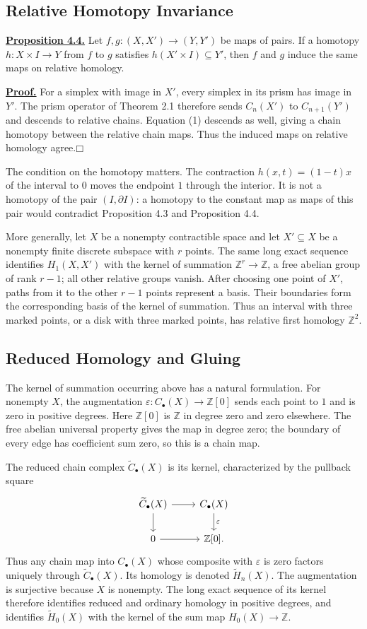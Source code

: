 \documentclass[11pt]{article}
\newcommand{\coursebold}[1]{{\color{burgundy}\textbf{#1}}}
\newcommand{\facehead}[1]{\subsection{#1}}
\begin{document}
\facehead{Relative Homotopy Invariance}
\hypertarget{prop34}{}\coursebold{\hyperlink{proof34}{Proposition 4.4.}} Let $f,g:(X,X')\to(Y,Y')$ be maps of pairs. If a homotopy $h:X\times I\to Y$ from $f$ to $g$ satisfies $h(X'\times I)\subseteq Y'$, then $f$ and $g$ induce the same maps on relative homology.

\hypertarget{proof34}{}\coursebold{\hyperlink{prop34}{Proof.}} For a simplex with image in $X'$, every simplex in its prism has image in $Y'$. The prism operator of Theorem 2.1 therefore sends $C_n(X')$ to $C_{n+1}(Y')$ and descends to relative chains. Equation (1) descends as well, giving a chain homotopy between the relative chain maps. Thus the induced maps on relative homology agree.\hfill$\mdlgwhtsquare$

The condition on the homotopy matters. The contraction $h(x,t)=(1-t)x$ of the interval to $0$ moves the endpoint $1$ through the interior. It is not a homotopy of the pair $(I,\partial I)$: a homotopy to the constant map as maps of this pair would contradict Proposition 4.3 and Proposition 4.4.

More generally, let $X$ be a nonempty contractible space and let $X'\subseteq X$ be a nonempty finite discrete subspace with $r$ points. The same long exact sequence identifies $H_1(X,X')$ with the kernel of summation $\mathbb Z^r\to\mathbb Z$, a free abelian group of rank $r-1$; all other relative groups vanish. After choosing one point of $X'$, paths from it to the other $r-1$ points represent a basis. Their boundaries form the corresponding basis of the kernel of summation. Thus an interval with three marked points, or a disk with three marked points, has relative first homology $\mathbb Z^2$.

\facehead{Reduced Homology and Gluing}
The kernel of summation occurring above has a natural formulation. For nonempty $X$, the augmentation $\varepsilon:C_\bullet(X)\to\mathbb Z[0]$ sends each point to $1$ and is zero in positive degrees. Here $\mathbb Z[0]$ is $\mathbb Z$ in degree zero and zero elsewhere. The free abelian universal property gives the map in degree zero; the boundary of every edge has coefficient sum zero, so this is a chain map.

The reduced chain complex $\widetilde C_\bullet(X)$ is its kernel, characterized by the pullback square
\[
\begin{tikzcd}
\widetilde C_\bullet(X)\arrow[r]\arrow[d]&C_\bullet(X)\arrow[d,"\varepsilon"]\\
0\arrow[r]&\mathbb Z[0].
\end{tikzcd}
\]
Thus any chain map into $C_\bullet(X)$ whose composite with $\varepsilon$ is zero factors uniquely through $\widetilde C_\bullet(X)$. Its homology is denoted $\widetilde H_n(X)$. The augmentation is surjective because $X$ is nonempty. The long exact sequence of its kernel therefore identifies reduced and ordinary homology in positive degrees, and identifies $\widetilde H_0(X)$ with the kernel of the sum map $H_0(X)\to\mathbb Z$.
\end{document}
